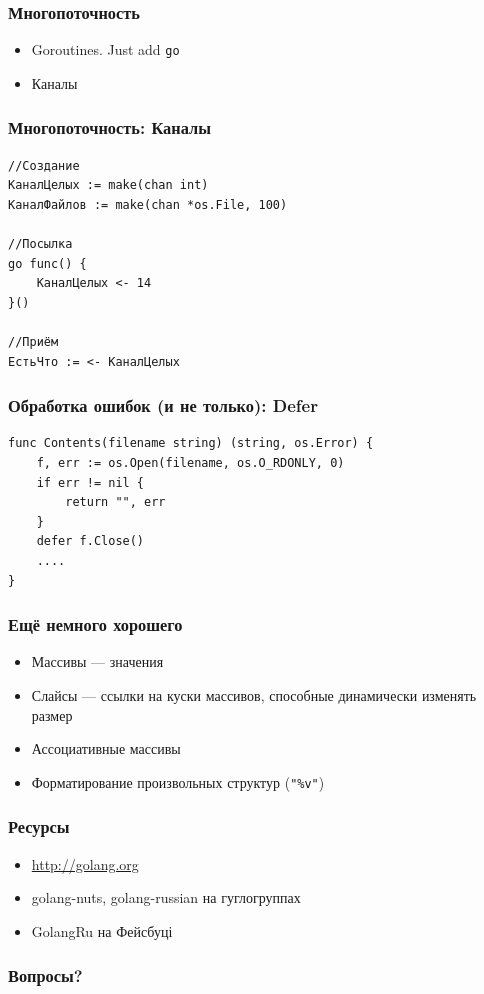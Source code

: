 \documentclass{beamer}
\begin{document}
\begin{frame}
  \frametitle{Многопоточность}
  \begin{itemize}
  \item Goroutines. Just add \texttt{go}
    \pause
  \item Каналы
  \end{itemize}
\end{frame}


\begin{frame}[fragile]
  \frametitle{Многопоточность: Каналы}
\begin{verbatim}
//Создание
КаналЦелых := make(chan int)
КаналФайлов := make(chan *os.File, 100)

//Посылка
go func() {
    КаналЦелых <- 14
}()

//Приём
ЕстьЧто := <- КаналЦелых
\end{verbatim}
\end{frame}


\begin{frame}[fragile]
  \frametitle{Обработка ошибок (и не только): Defer}
\begin{verbatim}
func Contents(filename string) (string, os.Error) {
    f, err := os.Open(filename, os.O_RDONLY, 0)
    if err != nil {
        return "", err
    }
    defer f.Close()
    ....
}
\end{verbatim}
\end{frame}


\begin{frame}
  \frametitle{Ещё немного хорошего}
  \begin{itemize}
  \item Массивы — значения
    \pause
  \item Слайсы — ссылки на куски массивов, способные динамически изменять размер
    \pause
  \item Ассоциативные массивы
    \pause
  \item Форматирование произвольных структур (\texttt{"\%v"})
  \end{itemize}
\end{frame}

\begin{frame}
  \frametitle{Ресурсы}
  \begin{itemize}
  \item {\color{blue}\url{http://golang.org}}
  \item golang-nuts, golang-russian на гуглогруппах
  \item GolangRu на Фейсбуці
  \end{itemize}
\end{frame}


\begin{frame}
  \frametitle{Вопросы?}
  \titlepage
\end{frame}
\end{document}
